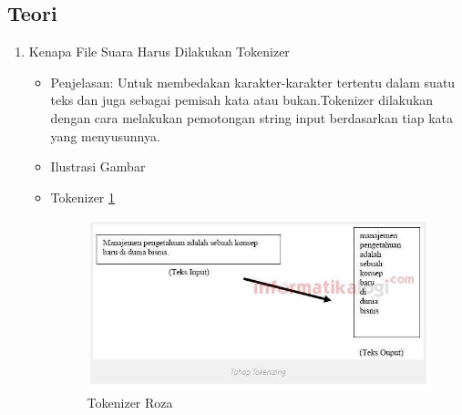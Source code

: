 \subsection{Teori}
\begin{enumerate}
\item Kenapa File Suara Harus Dilakukan Tokenizer
\begin{itemize}
\item Penjelasan: Untuk membedakan karakter-karakter tertentu dalam suatu teks dan juga sebagai pemisah kata atau bukan.Tokenizer dilakukan dengan cara melakukan pemotongan string input berdasarkan tiap kata yang menyusunnya.
\par 
\par
\item Ilustrasi Gambar
\item Tokenizer \ref{teori1}
\begin{figure}[!hbtp]
\centering
\includegraphics[scale=0.7]{figures/teori1.jpg}
\caption{Tokenizer Roza}
\label{teori1}
\end{figure}
\par
\end{itemize}
\par
\par


\end{enumerate}
